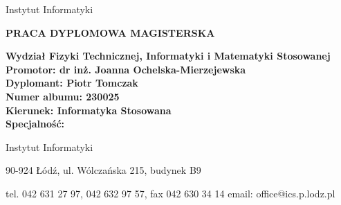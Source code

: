 {\begin{titlepage}
\begin{adjustwidth}{0cm}{0pt}
\begin{flushleft}
        {\selectfont\normalsize
        \textcolor{politechniczny}{Instytut Informatyki}}
    \end{flushleft}
    \end{adjustwidth}
    
    \begin{center}
        \vspace*{1.53cm}
        {\selectfont\large
        \uppercase{\textbf{Praca dyplomowa magisterska}}
        
        \vspace*{5.1cm}
        
        \fontsize{18pt}{22pt}\selectfont
        \textbf{\thetitle}}
        
        \vfill
    \end{center}
    
    {\selectfont\normalsize
    \begin{adjustwidth}{1cm}{0pt}
    \begin{flushleft}
        \textbf{Wydział Fizyki Technicznej, Informatyki i Matematyki Stosowanej}\\
        \textbf{Promotor: dr inż. Joanna Ochelska-Mierzejewska} \\
        \textbf{Dyplomant: Piotr Tomczak} \\
        \textbf{Numer albumu: 230025} \\
        \textbf{Kierunek: Informatyka Stosowana} \\
        \textbf{Specjalność: }
    \end{flushleft}
    \end{adjustwidth}
    
    \begin{center}
        \thedate
        \vspace*{2.05cm}
    \end{center}}
    
    \begin{adjustwidth}{0cm}{0pt}
    \begin{flushleft}
        {\selectfont\footnotesize
        \textcolor{politechniczny}{Instytut Informatyki}}
        
        \vspace*{0.1cm}
        
        {\selectfont\tiny
        90-924 \L{}\'od\'z, ul. W\'olcza\'nska 215, \textcolor{politechniczny}{budynek B9}
        
        \vspace*{-0.5cm}
        
        tel. 042 631 27 97, 042 632 97 57, fax 042 630 34 14 email: office@ics.p.lodz.pl}
        \vspace{-1.4cm}
    \end{flushleft}
    \end{adjustwidth}
\end{titlepage}}
\renewcommand{\baselinestretch}{1.5}
